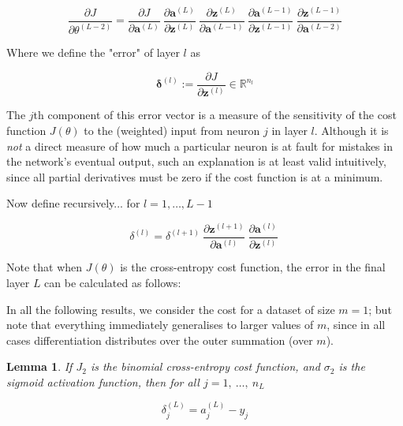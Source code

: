 \documentclass{article}[11pt]
\newtheorem{lemma}{Lemma}
\begin{document}
        $$
        \frac{\partial J}{\partial \theta^{(L-2)}} =
            \frac{\partial J}{\partial \mathbf{a}^{(L)}} \
            \frac{\partial \mathbf{a}^{(L)}}{\partial \mathbf{z}^{(L)}} \
            \frac{\partial \mathbf{z}^{(L)}}{\partial \mathbf{a}^{(L-1)}} \
            \frac{\partial \mathbf{a}^{(L-1)}}{\partial \mathbf{z}^{(L-1)}} \
            \frac{\partial \mathbf{z}^{(L-1)}}{\partial \mathbf{a}^{(L-2)}}
        $$



        Where we define the "error" of layer $l$ as
    
        $$
        \mathbf{\delta}^{(l)} :=  \frac{\partial J}{\partial \mathbf{z}^{(l)}} \in \mathbb{R}^{n_l}
        $$
        
        The $j$th component of this error vector is a measure of the sensitivity of the cost function $J(\theta)$ to the (weighted) input from neuron $j$ in layer $l$. Although it is \textit{not} a direct measure of how much a particular neuron is at fault for mistakes in the network's eventual output, such an explanation is at least valid intuitively, since all partial derivatives must be zero if the cost function is at a minimum.
        
        
        Now define recursively... for $l = 1, \ldots, L-1$
        
        $$
        \delta^{(l)} =
        \delta^{(l+1)} \
        \frac{\partial \mathbf{z}^{(l+1)}}{\partial \mathbf{a}^{(l)}} \
        \frac{\partial \mathbf{a}^{(l)}}{\partial \mathbf{z}^{(l)}} \
        $$
        
        
        
        Note that when $J(\theta)$ is the cross-entropy cost function, the error in the final layer $L$ can be calculated as follows:
        
        
        
        
        In all the following results, we consider the cost for a dataset of size $m = 1$; but note that everything immediately generalises to larger values of $m$, since in all cases differentiation distributes over the outer summation (over $m$).
        
        
        
        \begin{lemma}
            
            If $J_2$ is the binomial cross-entropy cost function, and $\sigma_2$ is the sigmoid activation function, then for all $j = 1, \ \ldots, \ n_L$
            
            $$
            \delta^{(L)}_j = a^{(L)}_j - y_j
            $$
            
        \end{lemma}
        
\end{document}
